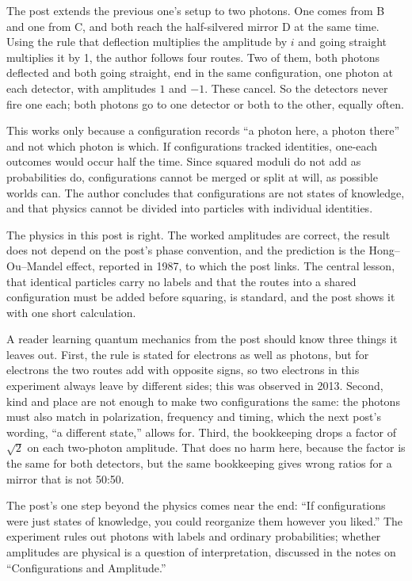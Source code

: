 \begin{afterword}
\summaryhead

The post extends the previous one's setup to two photons. One comes from B and one from C, and both reach the half-silvered mirror D at the same time. Using the rule that deflection multiplies the amplitude by $i$ and going straight multiplies it by 1, the author follows four routes. Two of them, both photons deflected and both going straight, end in the same configuration, one photon at each detector, with amplitudes $1$ and $-1$. These cancel. So the detectors never fire one each; both photons go to one detector or both to the other, equally often.

This works only because a configuration records ``a photon here, a photon there'' and not which photon is which. If configurations tracked identities, one-each outcomes would occur half the time. Since squared moduli do not add as probabilities do, configurations cannot be merged or split at will, as possible worlds can. The author concludes that configurations are not states of knowledge, and that physics cannot be divided into particles with individual identities.

\responsehead

The physics in this post is right. The worked amplitudes are correct, the result does not depend on the post's phase convention, and the prediction is the Hong--Ou--Mandel effect, reported in 1987, to which the post links. The central lesson, that identical particles carry no labels and that the routes into a shared configuration must be added before squaring, is standard, and the post shows it with one short calculation.

A reader learning quantum mechanics from the post should know three things it leaves out. First, the rule is stated for electrons as well as photons, but for electrons the two routes add with opposite signs, so two electrons in this experiment always leave by different sides; this was observed in 2013. Second, kind and place are not enough to make two configurations the same: the photons must also match in polarization, frequency and timing, which the next post's wording, ``a different state,'' allows for. Third, the bookkeeping drops a factor of $\sqrt{2}$ on each two-photon amplitude. That does no harm here, because the factor is the same for both detectors, but the same bookkeeping gives wrong ratios for a mirror that is not 50:50.

The post's one step beyond the physics comes near the end: ``If configurations were just states of knowledge, you could reorganize them however you liked.'' The experiment rules out photons with labels and ordinary probabilities; whether amplitudes are physical is a question of interpretation, discussed in the notes on ``Configurations and Amplitude.''


\end{afterword}
